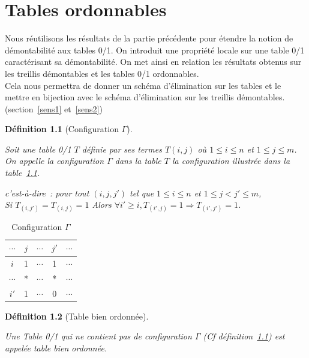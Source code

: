 \documentclass[a4paper]{report}
\newtheorem{definition}{Définition}[chapter]
\begin{document}
\chapter{Tables ordonnables}

\label{tdem}
Nous réutilisons les résultats de la partie précédente pour étendre la notion de démontabilité aux tables 0/1.
On introduit une propriété locale sur une table 0/1 caractérisant sa démontabilité. On met ainsi en relation 
les résultats obtenus sur les treillis démontables et les tables 0/1 ordonnables.\\
Cela nous permettra de donner un schéma d'élimination sur les tables et le mettre en bijection avec le schéma d'élimination sur les treillis
démontables.(section~\ref{sens1} et~\ref{sens2})

\begin{definition}[Configuration $\Gamma$]

\label{gamma}

Soit une table 0/1 $T$ définie par ses termes $T(i, j)$ où $1 \leq i \leq n$ et $1 \leq j \leq m$.
On appelle la configuration $\Gamma$ dans la table $T$ la configuration illustrée dans la table~\ref{gammma}.

c'est-à-dire~: 
pour tout $(i, j, j')$ tel que $1 \leq i \leq n$ et $1 \leq j < j' \leq m$,\\
Si $T_{(i, j')} = T_{(i, j)} = 1$ Alors $\forall i'\geqslant i, T_{(i', j)} = 1 \Rightarrow T_{(i', j')} = 1$.

\end{definition}

\begin{table}[htb]
\centering
 \begin{tabular}{*{4}{c|} c}
 
   $\cdots$ & $j$ & $\cdots$ & $j'$ & $\cdots$\\
 \hline
   $i$ & 1 & $\cdots$ & 1 & $\cdots$\\
 \hline
   $\cdots$ & * & $\cdots$ & * & $\cdots$\\
 \hline
   $i'$ & 1 & $\cdots$ & 0 & $\cdots$
 \end{tabular}
\caption{Configuration $\Gamma$}
\label{gammma}
\end{table}

\begin{definition}[Table bien ordonnée]

\label{demontable}

Une Table 0/1 qui ne contient pas de configuration $\Gamma$ (Cf définition~\ref{gamma}) est appelée
 table \textit{bien ordonnée}.
\end{definition}
\end{document}
